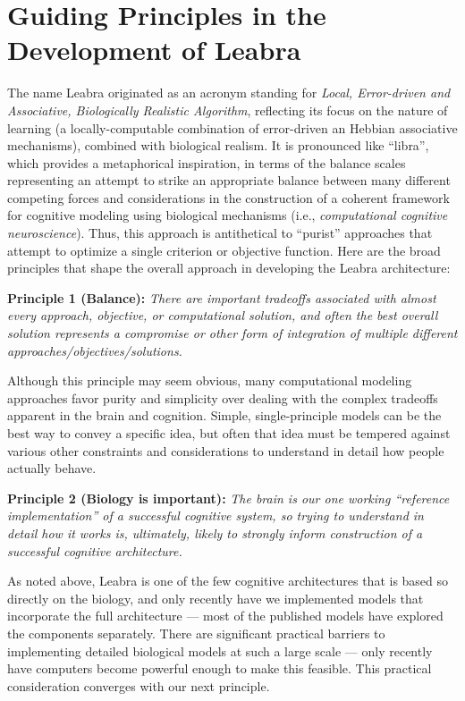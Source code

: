 \documentclass[11pt,twoside]{article}
\begin{document}
\section{Guiding Principles in the Development of Leabra}

The name Leabra originated as an acronym standing for {\em Local, Error-driven and Associative, Biologically Realistic Algorithm}, reflecting its focus on the nature of learning (a locally-computable combination of error-driven an Hebbian associative mechanisms), combined with biological realism.  It is pronounced like ``libra'', which provides a metaphorical inspiration, in terms of the balance scales representing an attempt to strike an appropriate balance between many different competing forces and considerations in the construction of a coherent framework for cognitive modeling using biological mechanisms (i.e., {\em computational cognitive neuroscience}).  Thus, this approach is antithetical to ``purist'' approaches that attempt to optimize a single criterion or objective function.  Here are the broad principles that shape the overall approach in developing the Leabra architecture:

{\bf Principle 1 (Balance):} {\em There are important tradeoffs associated with almost every approach, objective, or computational solution, and often the best overall solution represents a compromise or other form of integration of multiple different approaches/objectives/solutions.}

Although this principle may seem obvious, many computational modeling approaches favor purity and simplicity over dealing with the complex tradeoffs apparent in the brain and cognition.  Simple, single-principle models can be the best way to convey a specific idea, but often that idea must be tempered against various other constraints and considerations to understand in detail how people actually behave.

{\bf Principle 2 (Biology is important):} {\em The brain is our one working ``reference implementation'' of a successful cognitive system, so trying to understand in detail how it works is, ultimately, likely to strongly inform construction of a successful cognitive architecture.}

As noted above, Leabra is one of the few cognitive architectures that is based so directly on the biology, and only recently have we implemented models that incorporate the full architecture --- most of the published models have explored the components separately.  There are significant practical barriers to implementing detailed biological models at such a large scale --- only recently have computers become powerful enough to make this feasible.  This practical consideration converges with our next principle.
\end{document}
